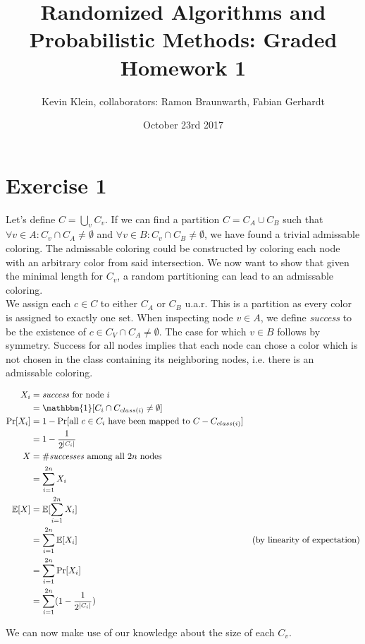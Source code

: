 \documentclass[a4paper,german]{article}
\title{Randomized Algorithms and Probabilistic Methods: Graded Homework 1}
\author{ Kevin Klein, collaborators: Ramon Braunwarth, Fabian Gerhardt}
\date{October 23rd 2017}
\begin{document}
\maketitle

\section*{Exercise 1}
Let's define \(C = \bigcup_{v} C_v\). If we can find a partition \(C = C_A \cup C_B\) such that \(\forall v \in A: C_v \cap C_A \neq \emptyset \) and \(\forall v \in B: C_v \cap C_B \neq \emptyset \), we have found a trivial admissable coloring. The admissable coloring could be constructed by coloring each node with an arbitrary color from said intersection.
We now want to show that given the minimal length for \(C_v\), a random partitioning can lead to an admissable coloring. \\

We assign each \(c \in C\) to either \(C_A\) or \(C_B\) u.a.r. This is a partition as every color is assigned to exactly one set. 
When inspecting node \(v \in A\), we define \emph{success} to be the existence of \(c \in C_V \cap C_A \neq \emptyset\). The case for which \(v \in B\) follows by symmetry. Success for all nodes implies that each node can chose a color which is not chosen in the class containing its neighboring nodes, i.e. there is an admissable coloring. 

\begin{align*} X_i &= \text{\emph{success} for node } i  \\
&= \mathbbm{1}[C_i \cap C_{class(i)} \neq \emptyset] \\
\Pr[X_i] &= 1 - \Pr[\text{all } c \in C_i \text{ have been mapped to } C - C_{class(i)}] \\
 &= 1 - \frac{1}{{2}^{|C_i|}} \\
 X &= \text{\#\emph{successes} among all } 2n \text{ nodes}\\
 &= \sum_{i=1}^{2n} X_i \\
 \mathbb{E}[X] &= \mathbb{E}[\sum_{i=1}^{2n} X_i ]\\
 &= \sum_{i=1}^{2n} \mathbb{E}[X_i ] & \text{(by linearity of expectation)} \\
 &=  \sum_{i=1}^{2n} \Pr[X_i ] \\
&=  \sum_{i=1}^{2n} (1 - \frac{1}{{2}^{|C_i|}}) 
\end{align*}

We can now make use of our knowledge about the size of each \(C_v\).
\end{document}
